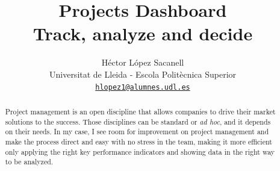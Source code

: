\documentclass[a4paper,12pt]{article}
\begin{document}
\title{Projects Dashboard \\ \vspace{2 mm} {\large Track, analyze and
decide}}

\author{H\'{e}ctor L\'{o}pez Sacanell \\
	\small Universitat de Lleida - Escola Polit\`{e}cnica Superior \\
	\small \texttt{\href{mailto:hlopez1@alumnes.udl.es}{hlopez1@alumnes.udl.es}}}

\maketitle
\begin{abstract}
Project management is an open discipline that allows companies to drive their
market solutions to the success. Those disciplines can be standard or \emph{ad
hoc}, and it depends on their needs. In my case, I see room for improvement on
project management and make the process direct and easy with no stress in the
team, making it more efficient only applying the right key performance
indicators and showing data in the right way to be analyzed.
\end{abstract}
\end{document}
